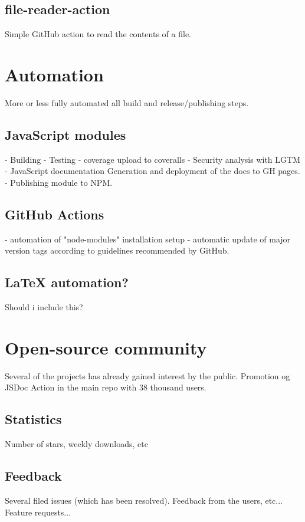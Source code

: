\subsection{file-reader-action}
Simple GitHub action to read the contents of a file.

\section{Automation}
More or less fully automated all build and release/publishing steps.
\subsection{JavaScript modules}
- Building
- Testing
- coverage upload to coveralls
- Security analysis with LGTM
- JavaScript documentation Generation and deployment of the docs to GH pages.
- Publishing module to NPM.

\subsection{GitHub Actions}
- automation of "node-modules" installation setup
- automatic update of major version tags according to guidelines recommended by GitHub.

\subsection{LaTeX automation?}
Should i include this?

\section{Open-source community}
Several of the projects has already gained interest by the public.
Promotion og JSDoc Action in the main repo with 38 thousand users.

\subsection{Statistics}
Number of stars, weekly downloads, etc
\subsection{Feedback}
Several filed issues (which has been resolved). Feedback from the users, etc... Feature requests...
